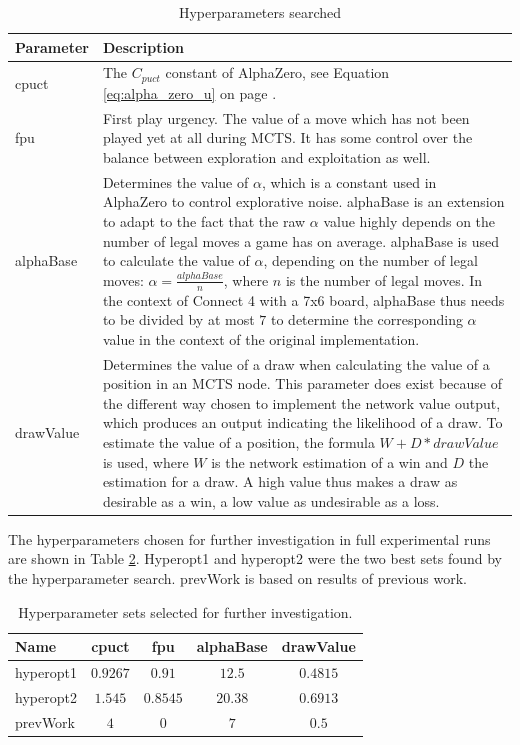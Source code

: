 \documentclass[12pt,onecolumn,oneside,titlepage]{article}
\begin{document}
\begin{table}[H]
  \centering
    \begin{tabularx}{\textwidth}{lX}
    \toprule
    Parameter     & Description \\
    \midrule
    cpuct          & The $C_{puct}$ constant of AlphaZero, see Equation \ref{eq:alpha_zero_u} on page \pageref{eq:alpha_zero_u}. \\
    \hline
    fpu          & First play urgency. The value of a move which has not been played yet at all during MCTS. It has some control over the balance between exploration and exploitation as well. \\
    \hline
    alphaBase          & Determines the value of $\alpha$, which is a constant used in AlphaZero to control explorative noise. alphaBase is an extension to adapt to the fact that the raw $\alpha$ value highly depends on the number of legal moves a game has on average.
      alphaBase is used to calculate the value of $\alpha$, depending on the number of legal moves: $\alpha = \frac{alphaBase}{n}$, where $n$ is the number of legal moves. 
      In the context of Connect 4 with a 7x6 board, alphaBase thus needs to be divided by at most $7$ to determine the corresponding $\alpha$ value in the context of the original implementation. \\
      \hline 
    drawValue & Determines the value of a draw when calculating the value of a position in an MCTS node. 
    This parameter does exist because of the different way chosen to implement the network value output, which produces
  an output indicating the likelihood of a draw. To estimate the value of a position, the formula $W + D*drawValue$ is used, where $W$ is the network estimation of a win and $D$ the estimation for a draw. A high value thus makes a draw
  as desirable as a win, a low value as undesirable as a loss.\\
    \bottomrule
    \end{tabularx}%
  \label{tab:addlabel}%
  \caption{Hyperparameters searched}
  \label{t:hyperparameters}
\end{table}

The hyperparameters chosen for further investigation in full experimental runs are shown in Table \ref{t:hyper_search_results}. 
Hyperopt1 and hyperopt2 were the two best sets found by the hyperparameter search. prevWork is based on results of previous work.

\begin{table} [H]
 \centering
  \begin{tabular}{ l | c c c c }
  Name & cpuct & fpu & alphaBase & drawValue \\
  \hline
  hyperopt1 & $0.9267$ & $0.91$ & $12.5$ & $0.4815$ \\
  hyperopt2 & $1.545$ & $0.8545$ & $20.38$ & $0.6913$ \\
  prevWork & $4$ & $0$ & $7$ & $0.5$ \\
  \end{tabular}
  \caption{Hyperparameter sets selected for further investigation.}
  \label{t:hyper_search_results}
\end{table}
\end{document}
